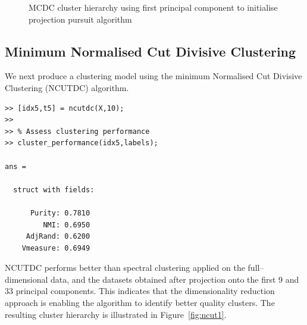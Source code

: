 \documentclass{book}
\begin{document}
\begin{figure}
\begin{htmlonly}
%
%
\end{htmlonly}
%
\caption{MCDC cluster hierarchy using first principal component to initialise
projection pursuit algorithm}
%
\label{fig:mcdc2}
\end{figure}



\subsection{Minimum Normalised Cut Divisive Clustering}

We next produce a clustering model using the minimum Normalised Cut Divisive Clustering
(NCUTDC) algorithm. 

\begin{verbatim}
>> [idx5,t5] = ncutdc(X,10);
>> 
>> % Assess clustering performance
>> cluster_performance(idx5,labels);

ans = 

  struct with fields:

      Purity: 0.7810
         NMI: 0.6950
     AdjRand: 0.6200
    Vmeasure: 0.6949

\end{verbatim}

\noindent
%
NCUTDC performs better than spectral clustering applied on the
full--dimensional data, and the datasets obtained after projection onto the
first 9 and 33 principal components.  This indicates that the dimensionality
reduction approach is enabling the algorithm to identify better quality
clusters. The resulting cluster hierarchy is illustrated in Figure~\ref{fig:ncut1}.
\end{document}
